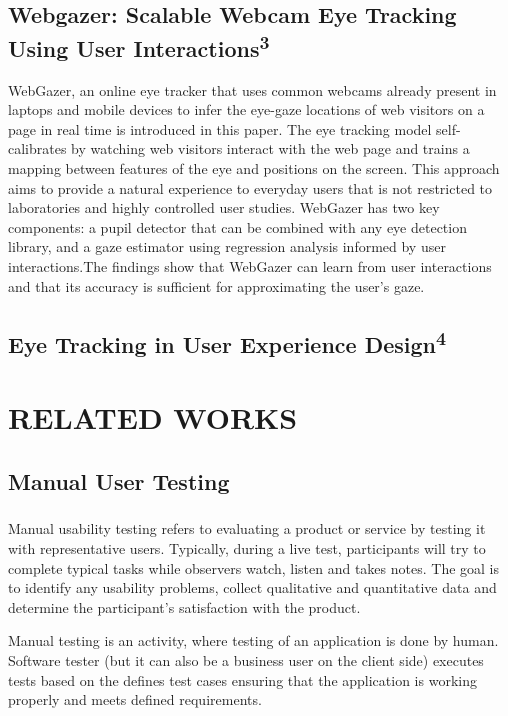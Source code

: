 \documentclass[12pt,a4paper,final]{extreport}
\begin{document}
\section{Webgazer: Scalable Webcam Eye Tracking Using User Interactions\textsuperscript{3}}
WebGazer, an online eye tracker that uses common webcams already present in laptops and mobile devices to infer the eye-gaze locations of web visitors on a page in real time is introduced in this paper. The eye tracking
model self-calibrates by watching web visitors interact with the web page and trains a mapping between features of the eye and positions on the screen. This
approach aims to provide a natural experience to everyday users that is not restricted to laboratories and highly controlled user studies. WebGazer has
two key components: a pupil detector that can be combined with any eye detection library, and a gaze estimator using regression analysis informed by user
interactions.The findings show that WebGazer can learn from user interactions and that its accuracy is sufficient for approximating the user’s gaze.

\section{Eye Tracking in User Experience Design\textsuperscript{4}}

\newpage
\chapter{RELATED WORKS}
\section{Manual User Testing}
\paragraph{}
Manual usability testing refers to evaluating a product or service by testing it with representative users. Typically, during a live test, participants will try to complete typical tasks while observers watch, listen and takes notes.  The goal is to identify any usability problems, collect qualitative and quantitative data and determine the participant's satisfaction with the product.

Manual testing is an activity, where testing of an application is done by human. Software tester (but it can also be a business user on the client side) executes tests based on the defines test cases ensuring that the application is working properly and meets defined requirements.
\end{document}

